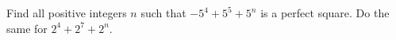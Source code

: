 Find all positive integers $n$ such that $-5^4 + 5^5 + 5^n$ is a perfect square. Do the same for $2^4 + 2^7 + 2^n.$